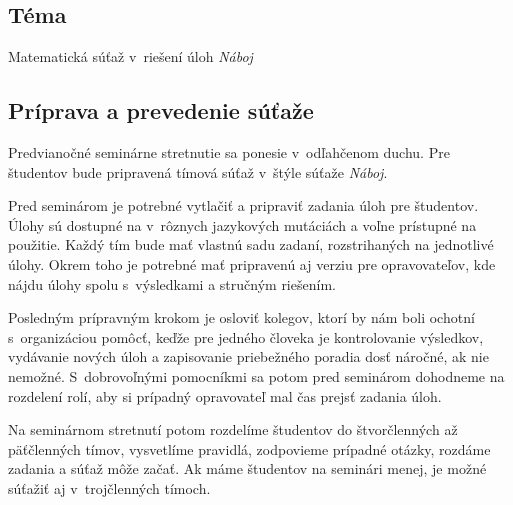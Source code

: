 
\subsection*{Téma}
Matematická súťaž v~riešení úloh \textit{Náboj}

\subsection*{Príprava a prevedenie súťaže}
Predvianočné seminárne stretnutie sa ponesie v~odľahčenom duchu. Pre študentov bude pripravená tímová súťaž v~štýle súťaže \textit{Náboj}.

Pred seminárom je potrebné vytlačiť a pripraviť zadania úloh pre študentov. Úlohy sú dostupné na  v~rôznych jazykových mutáciách a voľne prístupné na použitie. Každý tím bude mať vlastnú sadu zadaní, rozstrihaných na jednotlivé úlohy. Okrem toho je potrebné mať pripravenú aj verziu pre
opravovateľov, kde nájdu úlohy spolu s~výsledkami a stručným riešením.

Posledným prípravným krokom je osloviť kolegov, ktorí by nám boli ochotní s~organizáciou pomôcť, keďže pre jedného človeka je kontrolovanie výsledkov, vydávanie nových úloh a zapisovanie priebežného poradia dosť náročné, ak nie nemožné. S~dobrovoľnými pomocníkmi sa potom pred seminárom dohodneme na rozdelení rolí, aby si prípadný opravovateľ mal čas prejsť zadania úloh.

Na seminárnom stretnutí potom rozdelíme študentov do štvorčlenných až päťčlenných tímov, vysvetlíme pravidlá, zodpovieme prípadné otázky, rozdáme zadania a súťaž môže začať. Ak máme študentov na seminári menej, je možné súťažiť aj v~trojčlenných tímoch.
